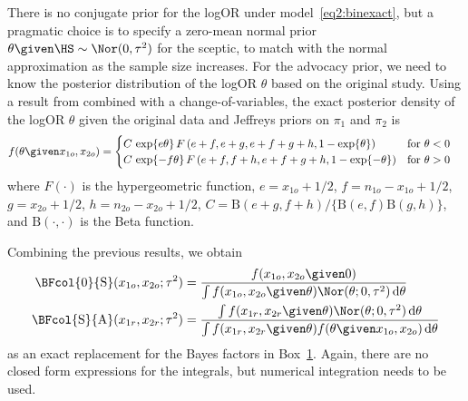 There is no conjugate prior for the logOR under model~\eqref{eq2:binexact}, but a
pragmatic choice is to specify a zero-mean normal prior
$\theta \given \HS \sim \Nor(0, \tau^{2})$ for the sceptic, to match with the
normal approximation as the sample size increases. For the advocacy prior, we
need to know the posterior distribution of the logOR $\theta$ based on the
original study.
Using a result from \citet{Marshall1988} combined with a change-of-variables,
the exact posterior density of the logOR $\theta$ given the original data and
Jeffreys priors on $\pi_1$ and $\pi_2$ is
\begin{align*}
  f(\theta \given x_{1o}, x_{2o}) &=
  \begin{cases}
    C \, \exp\{e \theta\} \,
    F\left(e + f, e + g, e + f + g + h, 1 - \exp\{\theta\}\right)
    & \text{for} ~ \theta < 0 \\
    C \, \exp\{-f \theta\} \,
    F\left(e + f, f + h, e + f + g + h, 1 - \exp\{-\theta\}\right)
    & \text{for} ~ \theta > 0 \\
  \end{cases}
\end{align*}
where $F(\cdot)$ is the hypergeometric function, $e = x_{1o} + 1/2$,
$f = n_{1o} - x_{1o} + 1/2$, $g = x_{2o} + 1/2$, $h = n_{2o} - x_{2o} + 1/2$,
$C = \text{B}(e + g, f + h)/\{\text{B}(e, f) \text{B}(g, h)\}$, and
$\text{B}(\cdot, \cdot)$ is the Beta function.

Combining the previous results, we obtain
\begin{align*}
  \BFcol{0}{\text{S}}(x_{1o}, x_{2o};\tau^{2})
  &= \frac{ f(x_{1o}, x_{2o} \given 0)}{\int
   f(x_{1o}, x_{2o} \given \theta)
  \Nor(\theta; 0, \tau^{2}) \, \text{d}\theta} \\
  \BFcol{\text{S}}{\text{A}}(x_{1r}, x_{2r};\tau^{2})
  &= \frac{\int f(x_{1r}, x_{2r} \given \theta)
    \Nor(\theta; 0, \tau^{2}) \, \text{d}\theta}{
    \int f(x_{1r}, x_{2r} \given \theta)
    f(\theta \given x_{1o}, x_{2o}) \, \text{d} \theta}
\end{align*}
as an exact replacement for the Bayes factors in Box~\hyperref[box:nutshell]{1}.
Again, there are no closed form expressions for the integrals, but numerical
integration needs to be used.


